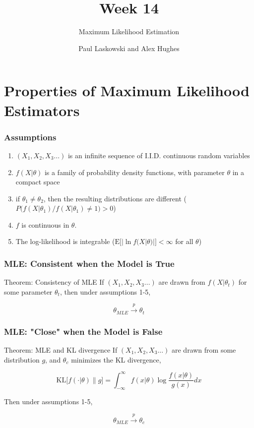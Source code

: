 \documentclass[12pt, block=fill]{beamer}
\title{Week 14}
\subtitle{Maximum Likelihood Estimation}
\author{Paul Laskowski and Alex Hughes}
\institute{UC Berkeley, School of Information}
\newcommand{\E}{\text{E}}
\begin{document}
\section{Properties of Maximum Likelihood Estimators}


\begin{frame}
  \frametitle{Assumptions}

  \begin{enumerate}
\item   $(X_1, X_2, X_3...)$ is an infinite sequence of I.I.D. continuous random variables
\item  $f(X|\theta)$ is a family of probability density functions, with parameter $\theta$ in a compact space
\item if $\theta_1 \neq \theta_2$, then the resulting distributions are different ($P\big(f(X|\theta_1)/f(X|\theta_1) \neq 1 \big) >0$)
\item $f$ is continuous in $\theta$.
\item The log-likelihood is integrable ($\E\big[ | \ln f(X|\theta) | \big] < \infty$ for all $\theta$)
\end{enumerate}
\end{frame}



\begin{frame}
\frametitle{MLE: Consistent when the Model is True}
\begin{block}{Theorem: Consistency of MLE}
If $(X_1, X_2, X_3...)$ are drawn from $f(X|\theta_t)$ for some parameter $\theta_t$, then under assumptions 1-5,

$$\theta_{MLE} \overset{p}{\rightarrow} \theta_t$$
\end{block}
\end{frame}

\begin{frame}
\frametitle{MLE: "Close" when the Model is False}
\begin{block}{Theorem: MLE and KL divergence}
If $(X_1, X_2, X_3...)$ are drawn from some distribution $g$, and $\theta_c$ minimizes the KL divergence,

$$\text{KL} \big[f(\cdot| \theta) \| g  \big] = \int_{-\infty}^\infty f( x | \theta) \log \frac{ f( x | \theta)}{g(x)}dx$$

Then under assumptions 1-5,

$$\theta_{MLE} \overset{p}{\rightarrow} \theta_c$$
\end{block}
\end{frame}
\end{document}
